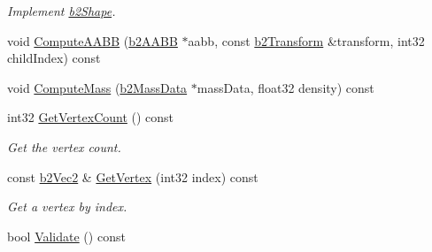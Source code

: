 \begin{DoxyCompactItemize}
\begin{DoxyCompactList}\small\item\em Implement \hyperlink{classb2_shape}{b2\+Shape}. \end{DoxyCompactList}\item 
void \hyperlink{classb2_polygon_shape_a00e225b0321bf6bb231a554036ffdf23}{Compute\+A\+A\+BB} (\hyperlink{structb2_a_a_b_b}{b2\+A\+A\+BB} $\ast$aabb, const \hyperlink{structb2_transform}{b2\+Transform} \&transform, int32 child\+Index) const 
\item 
void \hyperlink{classb2_polygon_shape_ad86c4c2a83a7122599462da83bf35389}{Compute\+Mass} (\hyperlink{structb2_mass_data}{b2\+Mass\+Data} $\ast$mass\+Data, float32 density) const 
\item 
int32 \hyperlink{classb2_polygon_shape_ae220f24c42eff4aef4cd452676ca2ced}{Get\+Vertex\+Count} () const \hypertarget{classb2_polygon_shape_ae220f24c42eff4aef4cd452676ca2ced}{}\label{classb2_polygon_shape_ae220f24c42eff4aef4cd452676ca2ced}

\begin{DoxyCompactList}\small\item\em Get the vertex count. \end{DoxyCompactList}\item 
const \hyperlink{structb2_vec2}{b2\+Vec2} \& \hyperlink{classb2_polygon_shape_a88cdb687ec7dc0cbcf4bd25fd37f4da1}{Get\+Vertex} (int32 index) const \hypertarget{classb2_polygon_shape_a88cdb687ec7dc0cbcf4bd25fd37f4da1}{}\label{classb2_polygon_shape_a88cdb687ec7dc0cbcf4bd25fd37f4da1}

\begin{DoxyCompactList}\small\item\em Get a vertex by index. \end{DoxyCompactList}\item 
bool \hyperlink{classb2_polygon_shape_afa9fe13cd6963e2317be35071ac69959}{Validate} () const 
\end{DoxyCompactItemize}
